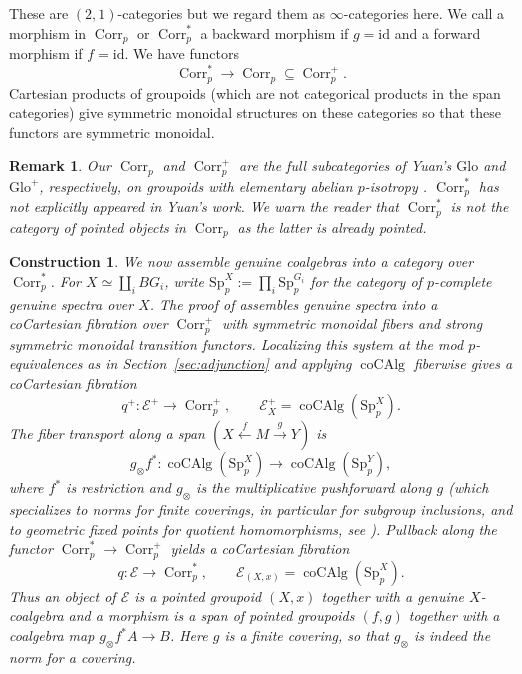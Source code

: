 \documentclass[11pt,a4paper]{article}
\newtheorem{construction}[thm]{Construction}
\newtheorem{remark}[thm]{Remark}
\theoremstyle{definition}
\newcommand{\Sp}{\mathrm{Sp}}
\newcommand{\coAlg}{\operatorname{coCAlg}}
\newcommand{\Corr}{\operatorname{Corr}_p}
\newcommand{\id}{\mathrm{id}}
\begin{document}
These are $(2,1)$-categories but we regard them as $\infty$-categories here.
We call a morphism in $\Corr$ or $\Corr^{*}$ a backward morphism if  $g=\id$ and a
forward morphism if $f=\id$.
We have functors
\[
 \Corr^{*}\longrightarrow\Corr\subseteq\Corr^{+}.
\]
Cartesian products of groupoids (which are not categorical products in the span categories) give symmetric monoidal structures
on these categories so that these functors are symmetric monoidal.

\begin{remark} Our $\Corr$ and $\Corr^{+}$ are the full
subcategories of Yuan's $\mathrm{Glo}$ and $\mathrm{Glo}^{+}$,
respectively, on groupoids with elementary abelian $p$-isotropy
\cite[Variant 2.5 and Definition 2.20]{Yuan}. $\Corr^*$ has not explicitly appeared in Yuan's work. We warn the reader that $\Corr^*$ is not the category of pointed objects in $\Corr$ as the latter is already pointed. 
\end{remark}

\begin{construction}\label{cons:qplus}
We now assemble genuine coalgebras into a category over $\Corr^{*}$.
For $X\simeq\coprod_i BG_i$, write
$\Sp_p^X:=\prod_i\Sp_p^{G_i}$ for the category of $p$-complete
genuine spectra over $X$. The proof of \cite[Theorem 2.18]{Yuan}
assembles genuine spectra into a coCartesian fibration over $\Corr^{+}$ with symmetric monoidal fibers and strong symmetric monoidal transition
functors. Localizing this system at the mod $p$-equivalences as
in Section~\ref{sec:adjunction} and applying $\coAlg$ fiberwise gives
a coCartesian fibration
\[
 q^{+}:\mathcal E^{+}\longrightarrow\Corr^{+},
 \qquad \mathcal E^{+}_X = \coAlg(\Sp_p^X).
\]
The fiber transport along a span
$(X\xleftarrow{f}M\xrightarrow{g}Y)$ is
\[
 g_\otimes f^*:\coAlg(\Sp_p^X)\longrightarrow\coAlg(\Sp_p^Y),
\]
where $f^*$ is restriction and $g_\otimes$ is the multiplicative pushforward along $g$ (which specializes to norms for finite coverings, in particular for subgroup inclusions,
and to geometric fixed points for quotient homomorphisms, see \cite[\S2.1]{Yuan}). Pullback along the functor $\Corr^{*}\to\Corr^{+}$ yields a coCartesian fibration
\begin{equation}\label{eq:coalgebra-fibration}
 q:  \mathcal E\longrightarrow\Corr^{*},
 \qquad \mathcal E_{(X,x)} = \coAlg(\Sp_p^X).
\end{equation}
Thus an object of $\mathcal E$ is a pointed groupoid $(X,x)$ together
with a genuine $X$-coalgebra and a morphism is a span of pointed groupoids $(f,g)$ together with 
a coalgebra map $g_\otimes f^*A\to B$. Here $g$ is a finite covering, so that $g_\otimes$ is indeed the norm for a covering. 
\end{construction}
\end{document}
